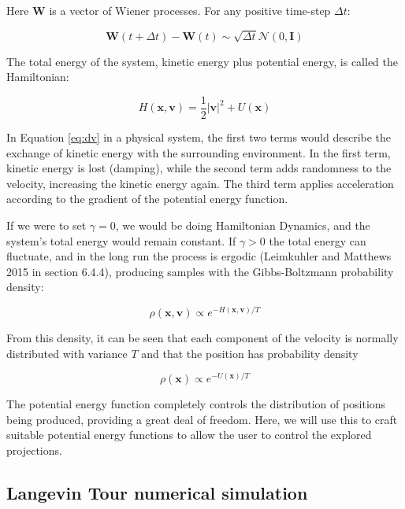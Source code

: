 Here \(\mathbf W\) is a vector of Wiener processes. For any positive time-step \(\Delta t\):

\[
\mathbf W(t+\Delta t) - \mathbf W(t) \sim \sqrt{\Delta t} \mathcal N(0,\mathbf I)
\]

The total energy of the system, kinetic energy plus potential energy, is called the Hamiltonian:

\begin{equation*}
H(\mathbf{x},\mathbf{v}) = \frac{1}{2}|\mathbf{v}|^2 + U(\mathbf{x})
\end{equation*}

In Equation \eqref{eq:dv} in a physical system, the first two terms would describe the exchange of kinetic energy with the surrounding environment. In the first term, kinetic energy is lost (damping), while the second term adds randomness to the velocity, increasing the kinetic energy again. The third term applies acceleration according to the gradient of the potential energy function.

If we were to set \(\gamma=0\), we would be doing Hamiltonian Dynamics, and the system's total energy would remain constant. If \(\gamma>0\) the total energy can fluctuate, and in the long run the process is ergodic (Leimkuhler and Matthews 2015 in section 6.4.4), producing samples with the Gibbs-Boltzmann probability density:

\begin{equation*}
\rho(\mathbf{x},\mathbf{v}) \propto e^{ -H(\mathbf{x},\mathbf{v})/T }
\end{equation*}

From this density, it can be seen that each component of the velocity is normally distributed with variance \(T\) and that the position has probability density

\begin{equation*}
\rho(\mathbf{x}) \propto e^{ -U(\mathbf{x})/T }
\end{equation*}

The potential energy function completely controls the distribution of positions being produced, providing a great deal of freedom. Here, we will use this to craft suitable potential energy functions to allow the user to control the explored projections.

\hypertarget{langevin-tour-numerical-simulation}{%
\subsection{Langevin Tour numerical simulation}\label{langevin-tour-numerical-simulation}}

